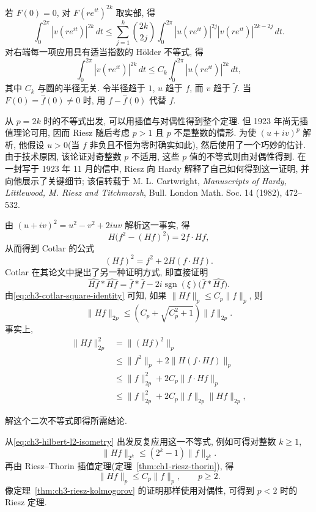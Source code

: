 \hypertarget{chapter-03-page-075}{}
若 $F(0)=0$, 对 $F(re^{it})^{2k}$ 取实部, 得
\[
 \int_0^{2\pi}|v(re^{it})|^{2k}\,dt
 \le\sum_{j=1}^k\binom{2k}{2j}
 \int_0^{2\pi}|u(re^{it})|^{2j}|v(re^{it})|^{2k-2j}\,dt.
\]
对右端每一项应用具有适当指数的 Hölder 不等式, 得
\[
 \int_0^{2\pi}|v(re^{it})|^{2k}\,dt
 \le C_k\int_0^{2\pi}|u(re^{it})|^{2k}\,dt,
\]
其中 $C_k$ 与圆的半径无关. 令半径趋于 $1$, $u$ 趋于 $f$, 而 $v$ 趋于 $\widetilde f$. 当 $F(0)=\widehat f(0)\ne0$ 时, 用 $f-\widehat f(0)$ 代替 $f$.

从 $p=2k$ 时的不等式出发, 可以用插值与对偶性得到整个定理. 但 1923 年尚无插值理论可用, 因而 Riesz 随后考虑 $p>1$ 且 $p$ 不是整数的情形. 为使 $(u+iv)^p$ 解析, 他假设 $u>0$(当 $f$ 非负且不恒为零时确实如此), 然后使用了一个巧妙的估计. 由于技术原因, 该论证对奇整数 $p$ 不适用, 这些 $p$ 值的不等式则由对偶性得到. 在一封写于 1923 年 11 月的信中, Riesz 向 Hardy 解释了自己如何得到这一证明, 并向他展示了关键细节; 该信转载于 M. L. Cartwright, \emph{Manuscripts of Hardy, Littlewood, M. Riesz and Titchmarsh}, Bull. London Math. Soc. 14 (1982), 472--532.

由 $(u+iv)^2=u^2-v^2+2iuv$ 解析这一事实, 得
\[
 H\bigl(f^2-(Hf)^2\bigr)=2f\cdot Hf,
\]
从而得到 Cotlar 的公式
\begin{equation}
\label{eq:ch3-cotlar-square-identity}
 (Hf)^2=f^2+2H(f\cdot Hf).
\end{equation}
Cotlar 在其论文中提出了另一种证明方式, 即直接证明
\[
 \widehat{Hf}*\widehat{Hf}
 =\widehat f*\widehat f
 -2i\operatorname{sgn}(\xi)\bigl(\widehat f*\widehat{Hf}\bigr).
\]
由\eqref{eq:ch3-cotlar-square-identity} 可知, 如果 $\|Hf\|_p\le C_p\|f\|_p$, 则
\[
 \|Hf\|_{2p}\le\left(C_p+\sqrt{C_p^2+1}\right)\|f\|_{2p}.
\]
事实上,
\[
\begin{aligned}
 \|Hf\|_{2p}^2
 &=\|(Hf)^2\|_p\\
 &\le\|f^2\|_p+2\|H(f\cdot Hf)\|_p\\
 &\le\|f\|_{2p}^2+2C_p\|f\cdot Hf\|_p\\
 &\le\|f\|_{2p}^2+2C_p\|f\|_{2p}\|Hf\|_{2p},
\end{aligned}
\]

\hypertarget{chapter-03-page-076}{}
解这个二次不等式即得所需结论.

从\eqref{eq:ch3-hilbert-l2-isometry} 出发反复应用这一不等式, 例如可得对整数 $k\ge1$,
\[
 \|Hf\|_{2^k}\le(2^k-1)\|f\|_{2^k}.
\]
再由 Riesz--Thorin 插值定理(定理~\ref{thm:ch1-riesz-thorin}), 得
\[
 \|Hf\|_p\le C_p\|f\|_p,
 \qquad p\ge2.
\]
像定理~\ref{thm:ch3-riesz-kolmogorov} 的证明那样使用对偶性, 可得到 $p<2$ 时的 Riesz 定理.


